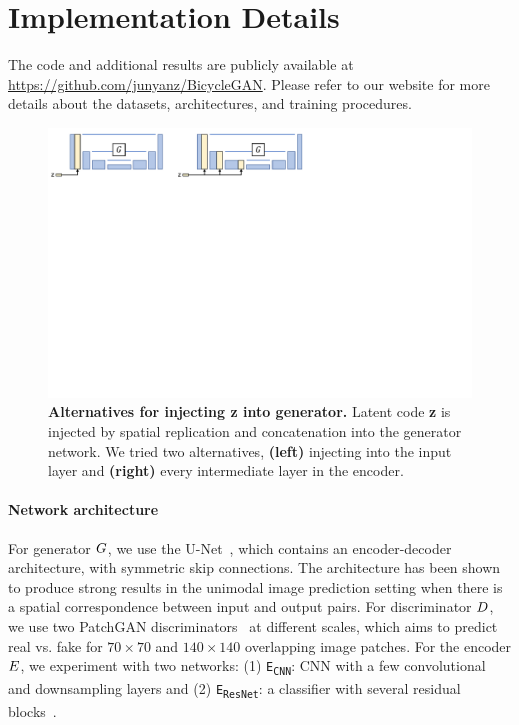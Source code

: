 \section{Implementation Details}
\label{sec:implementation}
The code and additional results are publicly available at \url{https://github.com/junyanz/BicycleGAN}. Please refer to our website for more details about the datasets, architectures, and training procedures.
\begin{figure}
\centering
\includegraphics[width=1.0\linewidth]{imgs/injectz.pdf}
\caption{\small \textbf{Alternatives for injecting {\bf z} into generator.} Latent code \textbf{z} is injected by spatial replication and concatenation into the generator network. We tried two alternatives, {\bf (left)} injecting into the input layer and {\bf (right)} every intermediate layer in the encoder.}
\vspace{-4mm}
\label{fig:addz}
\end{figure}

\paragraph{Network architecture} For generator $G$, we use the U-Net~\citep{ronneberger2015u}, which contains an encoder-decoder architecture, with symmetric skip connections. The architecture has been shown to produce strong results in the unimodal image prediction setting when there is a spatial correspondence between input and output pairs. For discriminator $D$, we use two PatchGAN discriminators~\citep{isola2016image} at different scales, which aims to predict real vs. fake for $70\times 70$ and $140 \times 140$ overlapping image patches. For the encoder $E$, we experiment with two networks: (1) \texttt{E\textsubscript{CNN}}: CNN with a few convolutional and downsampling layers and (2) \texttt{E\textsubscript{ResNet}}: a classifier with several residual blocks~\cite{he2016deep}.

